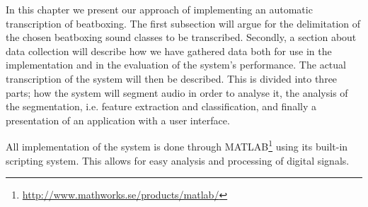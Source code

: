 In this chapter we present our approach of implementing an automatic transcription of beatboxing. The first subsection will argue for the delimitation of the chosen beatboxing sound classes to be transcribed. Secondly, a section about data collection will describe how we have gathered data both for use in the implementation and in the evaluation of the system's performance. The actual transcription of the system will then be described. This is divided into three parts; how the system will segment audio in order to analyse it, the analysis of the segmentation, i.e. feature extraction and classification, and finally a presentation of an application with a user interface.

All implementation of the system is done through MATLAB\footnote{\url{http://www.mathworks.se/products/matlab/}} using its built-in scripting system. This allows for easy analysis and processing of digital signals.







